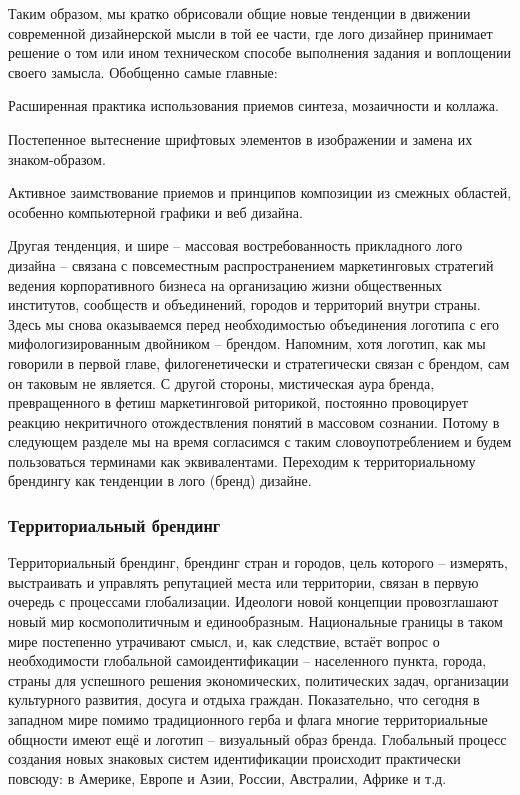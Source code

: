 Таким образом, мы кратко обрисовали общие новые тенденции в движении современной дизайнерской мысли
в той ее части, где лого дизайнер принимает решение о том или ином техническом способе выполнения
задания и воплощении своего замысла. Обобщенно самые главные:
\begin{enumerate*}[label=\arabic*)]
\item Расширенная практика использования приемов синтеза, мозаичности и коллажа.
\item Постепенное вытеснение шрифтовых элементов в изображении и замена их знаком-образом.
\item Активное заимствование приемов и принципов композиции из смежных областей, особенно компьютерной графики и веб дизайна.
\end{enumerate*}

Другая тенденция, и шире -- массовая  востребованность  прикладного лого дизайна -- связана с
повсеместным распространением  маркетинговых стратегий ведения корпоративного бизнеса на организацию
жизни общественных институтов, сообществ и объединений, городов и территорий внутри страны. Здесь мы
снова оказываемся перед необходимостью объединения логотипа с его мифологизированным двойником --
брендом. Напомним, хотя логотип, как мы говорили в первой главе, филогенетически и стратегически
связан с брендом, сам он таковым не является. С другой стороны, мистическая аура бренда,
превращенного в фетиш маркетинговой риторикой, постоянно провоцирует реакцию некритичного
отождествления понятий в массовом сознании. Потому в следующем разделе мы на время согласимся с
таким словоупотреблением и будем пользоваться терминами как эквивалентами. Переходим к
территориальному брендингу как тенденции в лого (бренд) дизайне.

\subsubsection{Территориальный брендинг}

Территориальный брендинг, брендинг стран и городов, цель которого -- измерять, выстраивать и
управлять репутацией места или территории, связан в первую очередь с процессами
глобализации. Идеологи новой концепции провозглашают  новый мир  космополитичным и единообразным.
Национальные границы в таком мире постепенно утрачивают смысл, и, как следствие, встаёт вопрос о
необходимости глобальной самоидентификации --  населенного пункта, города, страны  для успешного
решения экономических, политических задач, организации культурного развития, досуга и отдыха
граждан. Показательно, что сегодня в западном мире помимо традиционного герба и флага многие
территориальные общности имеют ещё и логотип -- визуальный образ бренда. Глобальный процесс создания
новых знаковых систем идентификации происходит практически повсюду: в Америке, Европе и Азии,
России, Австралии, Африке и т.д.

